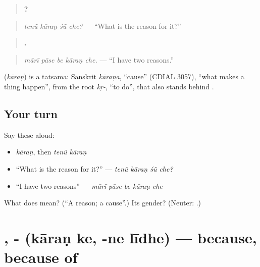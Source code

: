 \begin{quote}
\textbf{   ?}
\end{quote}

\begin{quote}
\emph{tenũ kāraṇ śũ che?} — \textquotedblleft{}What is the reason for it?\textquotedblright{}
\end{quote}

\begin{quote}
\textbf{    .}
\end{quote}

\begin{quote}
\emph{mārī pāse be kāraṇ che.} — \textquotedblleft{}I have two reasons.\textquotedblright{}
\end{quote}

\begin{cousinweb}
\textbf{} (\emph{kāraṇ}) is a tatsama: Sanskrit \emph{kāraṇa}, \textquotedblleft{}cause\textquotedblright{} (CDIAL 3057), \textquotedblleft{}what makes a thing happen\textquotedblright{}, from the root \emph{kṛ-}, \textquotedblleft{}to do\textquotedblright{}, that also stands behind \textbf{}.
\end{cousinweb}

\subsection*{Your turn}
Say these aloud:

\begin{itemize}
\raggedright
  \item \emph{kāraṇ}, then \emph{tenũ kāraṇ}
  \item \textquotedblleft{}What is the reason for it?\textquotedblright{} — \emph{tenũ kāraṇ śũ che?}
  \item \textquotedblleft{}I have two reasons\textquotedblright{} — \emph{mārī pāse be kāraṇ che}
\end{itemize}

\begin{tcolorbox}[breakable,colback=teal!4,colframe=teal!35!black,title={Before you move on}]
What does \textbf{} mean? (\textquotedblleft{}A reason; a cause\textquotedblright{}.) Its gender? (Neuter: \textbf{ }.)
\end{tcolorbox}
\section[\texorpdfstring{\gu{કારણ} \gu{કે} · -\gu{ને} \gu{લીધે} (kāraṇ ke · -ne līdhe)}{કારણ કે · -ને લીધે (kāraṇ ke · -ne līdhe)}]{ , -  (kāraṇ ke, -ne līdhe) — because, because of}

